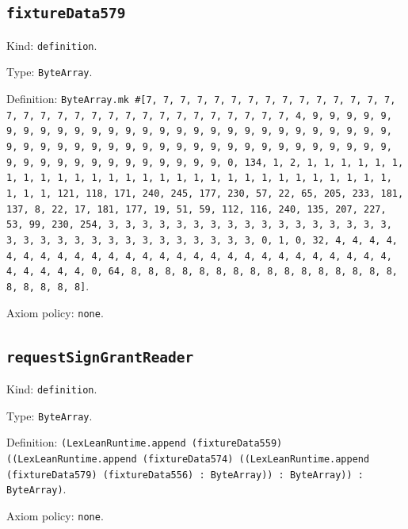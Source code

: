 \documentclass[11pt]{article}
\begin{document}
\subsection*{\texttt{fixtureData579}}
\noindent Kind: \texttt{definition}.\par
\noindent Type: \texttt{ByteArray}.\par
\noindent Definition: \texttt{ByteArray.mk \#[7, 7, 7, 7, 7, 7, 7, 7, 7, 7, 7, 7, 7, 7, 7, 7, 7, 7, 7, 7, 7, 7, 7, 7, 7, 7, 7, 7, 7, 7, 7, 7, 4, 9, 9, 9, 9, 9, 9, 9, 9, 9, 9, 9, 9, 9, 9, 9, 9, 9, 9, 9, 9, 9, 9, 9, 9, 9, 9, 9, 9, 9, 9, 9, 9, 9, 9, 9, 9, 9, 9, 9, 9, 9, 9, 9, 9, 9, 9, 9, 9, 9, 9, 9, 9, 9, 9, 9, 9, 9, 9, 9, 9, 9, 9, 9, 9, 0, 134, 1, 2, 1, 1, 1, 1, 1, 1, 1, 1, 1, 1, 1, 1, 1, 1, 1, 1, 1, 1, 1, 1, 1, 1, 1, 1, 1, 1, 1, 1, 1, 1, 1, 1, 121, 118, 171, 240, 245, 177, 230, 57, 22, 65, 205, 233, 181, 137, 8, 22, 17, 181, 177, 19, 51, 59, 112, 116, 240, 135, 207, 227, 53, 99, 230, 254, 3, 3, 3, 3, 3, 3, 3, 3, 3, 3, 3, 3, 3, 3, 3, 3, 3, 3, 3, 3, 3, 3, 3, 3, 3, 3, 3, 3, 3, 3, 3, 3, 0, 1, 0, 32, 4, 4, 4, 4, 4, 4, 4, 4, 4, 4, 4, 4, 4, 4, 4, 4, 4, 4, 4, 4, 4, 4, 4, 4, 4, 4, 4, 4, 4, 4, 4, 4, 0, 64, 8, 8, 8, 8, 8, 8, 8, 8, 8, 8, 8, 8, 8, 8, 8, 8, 8, 8, 8, 8, 8]}.\par
\noindent Axiom policy: \texttt{none}.\par
\subsection*{\texttt{requestSignGrantReader}}
\noindent Kind: \texttt{definition}.\par
\noindent Type: \texttt{ByteArray}.\par
\noindent Definition: \texttt{(LexLeanRuntime.append (fixtureData559) ((LexLeanRuntime.append (fixtureData574) ((LexLeanRuntime.append (fixtureData579) (fixtureData556) : ByteArray)) : ByteArray)) : ByteArray)}.\par
\noindent Axiom policy: \texttt{none}.\par
\end{document}
